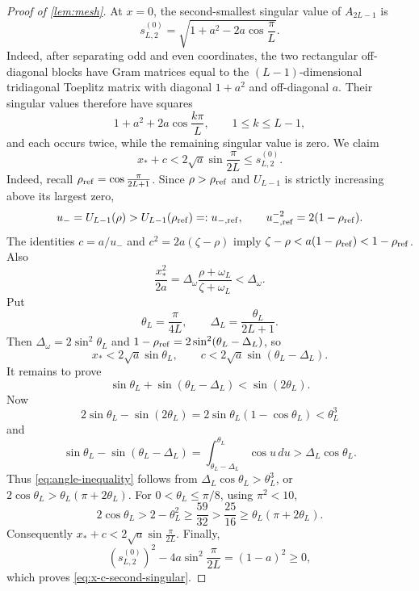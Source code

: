 \documentclass[review,hidelinks,onefignum,onetabnum]{siamart251216}
\begin{document}
\begin{proof}[Proof of \cref{lem:mesh}]
At \(x=0\), the second-smallest singular value of \(A_{2L-1}\) is
\[
 s_{L,2}^{(0)}=\sqrt{1+a^2-2a\cos\frac{\pi}{L}}.
\]
Indeed, after separating odd and even coordinates, the two rectangular
off-diagonal blocks have Gram matrices equal to the
\((L-1)\)-dimensional tridiagonal Toeplitz matrix with diagonal
\(1+a^2\) and off-diagonal \(a\).  Their singular values therefore have
squares
\[
 1+a^2+2a\cos\frac{k\pi}{L},\qquad 1\leq k\leq L-1,
\]
and each occurs twice, while the remaining singular value is zero.
We claim
\begin{equation}\label{eq:x-c-second-singular}
 x_*+c<2\sqrt a\sin\frac{\pi}{2L}\leq s_{L,2}^{(0)}.
\end{equation}
Indeed, recall \(\rho_{\rm ref}=\cos\frac{\pi}{2L+1}\).  Since
\(\rho>\rho_{\rm ref}\) and \(U_{L-1}\) is strictly increasing above its
largest zero,
\[
 u_-=U_{L-1}(\rho)>U_{L-1}(\rho_{\rm ref})=:u_{-,\rm ref},
 \qquad u_{-,\rm ref}^{-2}=2(1-\rho_{\rm ref}).
\]
The identities \(c=a/u_-\) and \(c^2=2a(\zeta-\rho)\) imply
\(\zeta-\rho<a(1-\rho_{\rm ref})<1-\rho_{\rm ref}\).  Also
\[
 \frac{x_*^2}{2a}
 =\Delta_\omega\frac{\rho+\omega_L}{\zeta+\omega_L}
 <\Delta_\omega.
\]
Put
\[
 \theta_L=\frac{\pi}{4L},\qquad
 \Delta_L=\frac{\theta_L}{2L+1}.
\]
Then \(\Delta_\omega=2\sin^2\theta_L\) and
\(1-\rho_{\rm ref}=2\sin^2(\theta_L-\Delta_L)\), so
\[
 x_*<2\sqrt a\sin\theta_L,
 \qquad c<2\sqrt a\sin(\theta_L-\Delta_L).
\]
It remains to prove
\begin{equation}\label{eq:angle-inequality}
 \sin\theta_L+\sin(\theta_L-\Delta_L)<\sin(2\theta_L).
\end{equation}
Now
\[
 2\sin\theta_L-\sin(2\theta_L)
 =2\sin\theta_L(1-\cos\theta_L)<\theta_L^3
\]
and
\[
 \sin\theta_L-\sin(\theta_L-\Delta_L)
 =\int_{\theta_L-\Delta_L}^{\theta_L}\cos u\,du
 >\Delta_L\cos\theta_L.
\]
Thus \eqref{eq:angle-inequality} follows from
\(\Delta_L\cos\theta_L>\theta_L^3\), or
\(2\cos\theta_L>\theta_L(\pi+2\theta_L)\).  For
\(0<\theta_L\leq\pi/8\), using \(\pi^2<10\),
\[
 2\cos\theta_L>2-\theta_L^2\geq\frac{59}{32}
 >\frac{25}{16}\geq\theta_L(\pi+2\theta_L).
\]
Consequently \(x_*+c<2\sqrt a\sin\frac{\pi}{2L}\).  Finally,
\[
 (s_{L,2}^{(0)})^2-4a\sin^2\frac{\pi}{2L}
 =(1-a)^2\geq0,
\]
which proves \eqref{eq:x-c-second-singular}.


\end{proof}
\end{document}
